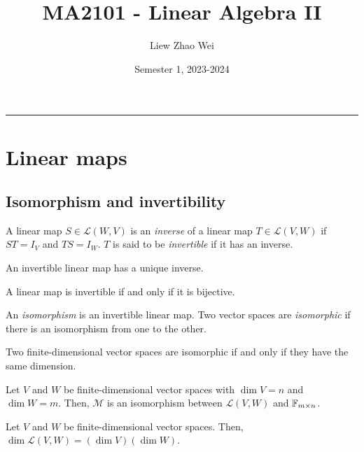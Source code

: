 \documentclass{article}
\title{MA2101 - Linear Algebra II}
\author{Liew Zhao Wei}
\date{Semester 1, 2023-2024}
\begin{document}
\maketitle
\hrule

\section{Linear maps}

\subsection{Isomorphism and invertibility}

\begin{theorem}
  A linear map $S \in \mathcal{L}(W, V)$ is an \emph{inverse} of a linear map $T \in \mathcal{L}(V, W)$ if $ST = I_V$ and $TS = I_W$.
  $T$ is said to be \emph{invertible} if it has an inverse.
\end{theorem}

\begin{remark}
  An invertible linear map has a unique inverse.
\end{remark}

\begin{theorem}
  A linear map is invertible if and only if it is bijective.
\end{theorem}

\begin{definition}[Isomorphism]
  An \emph{isomorphism} is an invertible linear map.
  Two vector spaces are \emph{isomorphic} if there is an isomorphism from one to the other.
\end{definition}

\begin{theorem}
  Two finite-dimensional vector spaces are isomorphic if and only if they have the same dimension.
\end{theorem}

\begin{theorem}
  Let $V$ and $W$ be finite-dimensional vector spaces with $\dim V = n$ and $\dim W = m$.
  Then, $\mathcal{M}$ is an isomorphism between $\mathcal{L}(V, W)$ and $\mathbb{F}_{m \times n}$.
\end{theorem}

\begin{corollary}[$\dim \mathcal{L}(V, W) = (\dim V)(\dim W)$]
  Let $V$ and $W$ be finite-dimensional vector spaces.
  Then, $\dim \mathcal{L}(V, W) = (\dim V)(\dim W)$.
\end{corollary}
\end{document}
